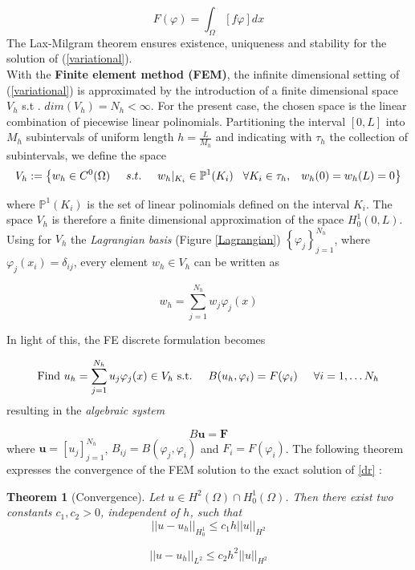 \documentclass[12pt, a4paper]{report}
\newtheorem{theorem}{Theorem}[section]
\begin{document}
\begin{enumerate}
	\begin{equation}
	F(\varphi) = \int_{\Omega} \left[f \varphi\right] dx
	\end{equation}
	The Lax-Milgram theorem \cite{40} ensures existence, uniqueness and stability for the solution of (\ref{variational}).\\
	With the \textbf{Finite element method (FEM)}, the infinite dimensional setting of (\ref{variational}) is approximated by the introduction of a finite dimensional space $V_h$ s.t . $dim(V_h) = N_h < \infty$. For the present case, the chosen space is the linear combination of piecewise linear polinomials. Partitioning the interval $[0,L]$ into $M_h$ subintervals of uniform length $ h = \frac{L}{M_h}$ and indicating with $\tau_h$ the collection of subintervals, we define the space
	$$ V_h := \left\{ w_h\in C^0(\Omega) \hspace{0.5 cm} s.t. \hspace{0.5 cm} w_h|_{K_i} \in \mathbb{P}^1(K_i) \hspace{0.3 cm} \forall K_i \in \tau_h, \hspace{0.3 cm} w_h(0)=w_h(L)=0 \right\}$$
	
	where $ \mathbb{P}^1(K_i)$ is the set of linear polinomials defined on the interval $K_i$. The space $V_h$ is therefore a finite dimensional approximation of the space $H_0^1(0,L)$. Using for $V_h$ the \textit{Lagrangian basis} (Figure \ref{Lagrangian}) $ \left\{ \varphi _j \right\}_{j=1}^{N_h}$, where $ \varphi_j(x_i) = \delta_{ij}$, every element $w_h \in V_h$ can be written as
	
	\begin{equation}
	w_h = \sum_{j=1}^{N_h} w_j \varphi_j(x)
	\end{equation}
	
	In light of this, the FE discrete formulation becomes
	
	\begin{equation}
	\text{Find $u_h = \sum_{j=1}^{N_h} u_j \varphi_j(x) \in V_h$ s.t.} \hspace{0.5cm} B(u_h,\varphi_i) = F(\varphi_i) \hspace{0.5cm} \forall i = 1, \dots N_h
	\end{equation}
	resulting in the \textit{algebraic system}
	
	\begin{equation}
	B \textbf{u} = \textbf{F} \label{algebraic}
	\end{equation}
	where $\textbf{u} = [u_j]_{j=1}^{N_h}$, $B_{ij} = B(\varphi_j,\varphi_i)$ and $F_i = F(\varphi_i)$. The following theorem expresses the convergence of the FEM solution to the exact solution of \ref{dr} \cite{40}:
	\begin{theorem}[Convergence]
		Let $u \in H^2(\Omega) \cap H_0^1(\Omega)$. Then there exist two constants $c_1,c_2 >0$, independent of $h$, such that
		$$||u-u_h||_{H_0^1} \le c_1h||u||_{H^2}$$
		
		$$||u-u_h||_{L^2} \le c_2h^2||u||_{H^2}$$
	\end{theorem}
\end{enumerate}
\end{document}
